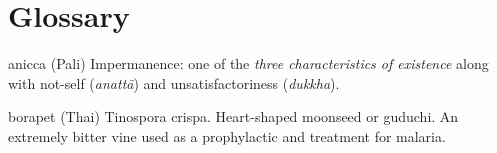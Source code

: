 \chapter{Glossary}

\begin{glossarydescription}


\item[anicca] (Pali) Impermanence: one of the \emph{three characteristics of
    existence} along with not-self (\emph{anattā}) and unsatisfactoriness
  (\emph{dukkha}).


\item[borapet] (Thai) Tinospora crispa. Heart-shaped moonseed or guduchi.
  An extremely bitter vine used as a prophylactic and treatment for malaria.






















\end{glossarydescription}

